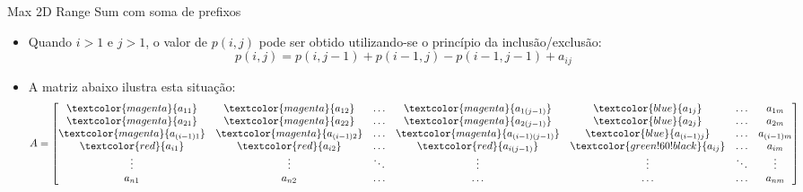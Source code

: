 \begin{frame}[fragile]{Max 2D Range Sum com soma de prefixos}

    \begin{itemize}
        \item Quando $i > 1$ e $j > 1$, o valor de $p(i, j)$ pode ser obtido utilizando-se o
            princípio da inclusão/exclusão:
        \[
            p(i, j) = p(i, j - 1) + p(i - 1, j) - p(i - 1, j - 1) + a_{ij}
        \]
        
        \item A matriz abaixo ilustra esta situação:
        \[
            A = \begin{bmatrix}
                    \textcolor{magenta}{{a_{11}}} & \textcolor{magenta}{{a_{12}}} &
                        \ldots & \textcolor{magenta}{{a_{1(j - 1)}}} & \textcolor{blue}{a_{1j}} & \ldots & a_{1m} \\
                    \textcolor{magenta}{{a_{21}}} & \textcolor{magenta}{{a_{22}}} &
                        \ldots & \textcolor{magenta}{{a_{2(j - 1)}}} & \textcolor{blue}{a_{2j}} & \ldots & a_{2m} \\
                    \textcolor{magenta}{{a_{(i - 1)1}}} & \textcolor{magenta}{{a_{(i - 1)2}}} &
                        \ldots & \textcolor{magenta}{{a_{(i - 1)(j - 1)}}} & \textcolor{blue}{a_{(i - 1)j}} & \ldots & a_{(i - 1)m} \\
                    \textcolor{red}{{a_{i1}}} & \textcolor{red}{{a_{i2}}} &
                        \ldots & \textcolor{red}{{a_{i(j - 1)}}} & \textcolor{green!60!black}{a_{ij}} & \ldots & a_{im} \\
                \vdots & \vdots & \ddots & \vdots & \vdots & \ddots & \vdots \\
                a_{n1} & a_{n2} & \ldots & \ldots & \ldots & \ldots & a_{nm} \\
                \end{bmatrix}
        \]
    \end{itemize}

\end{frame}

